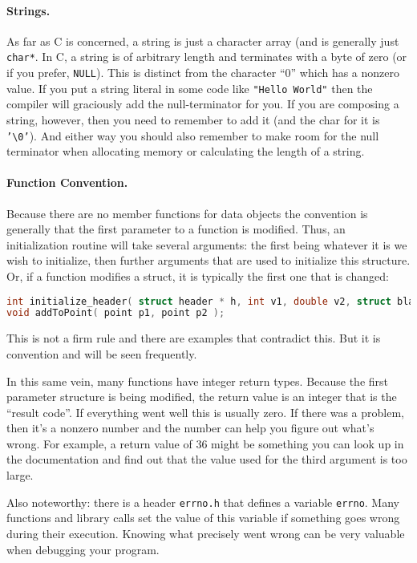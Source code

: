 \paragraph{Strings.}

As far as C is concerned, a string is just a character array (and is generally just \texttt{char*}. In C, a string is of arbitrary length and terminates with a byte of zero (or if you prefer, \texttt{NULL}). This is distinct from the character ``0'' which has a nonzero value. If you put a string literal in some code like \texttt{"Hello World"} then the compiler will graciously add the null-terminator for you. If you are composing a string, however, then you need to remember to add it (and the char for it is \texttt{'\textbackslash0'}). And either way you should also remember to make room for the null terminator when allocating memory or calculating the length of a string.

\paragraph{Function Convention.}

Because there are no member functions for data objects the convention is generally that the first parameter to a function is modified. Thus, an initialization routine will take several arguments: the first being whatever it is we wish to initialize, then further arguments that are used to initialize this structure. Or, if a function modifies a struct, it is typically the first one that is changed:

\begin{lstlisting}[language=C]
int initialize_header( struct header * h, int v1, double v2, struct blah * v3 );
void addToPoint( point p1, point p2 );
\end{lstlisting}

This is not a firm rule and there are examples that contradict this. But it is convention and will be seen frequently.

In this same vein, many functions have integer return types. Because the first parameter structure is being modified, the return value is an integer that is the ``result code''. If everything went well this is usually zero. If there was a problem, then it's a nonzero number and the number can help you figure out what's wrong. For example, a return value of 36 might be something you can look up in the documentation and find out that the value used for the third argument is too large.

Also noteworthy: there is a header \texttt{errno.h} that defines a variable \texttt{errno}. Many functions and library calls set the value of this variable if something goes wrong during their execution. Knowing what precisely went wrong can be very valuable when debugging your program.

